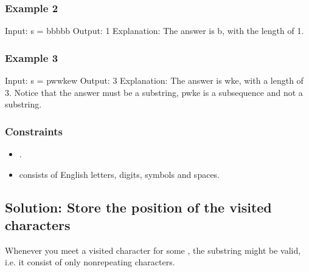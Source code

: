 \documentclass[letterpaper,12pt,english]{book}
\begin{document}
\subsubsection{Example 2}
\label{\detokenize{String/08_STR_3_Longest_Substring_Without_Repeating_Characters:example-2}}
\begin{sphinxVerbatim}[commandchars=\\\{\}]
Input: s = \PYGZdq{}bbbbb\PYGZdq{}
Output: 1
Explanation: The answer is \PYGZdq{}b\PYGZdq{}, with the length of 1.
\end{sphinxVerbatim}


\subsubsection{Example 3}
\label{\detokenize{String/08_STR_3_Longest_Substring_Without_Repeating_Characters:example-3}}
\begin{sphinxVerbatim}[commandchars=\\\{\}]
Input: s = \PYGZdq{}pwwkew\PYGZdq{}
Output: 3
Explanation: The answer is \PYGZdq{}wke\PYGZdq{}, with a length of 3.
Notice that the answer must be a substring, \PYGZdq{}pwke\PYGZdq{} is a subsequence and not a substring.
\end{sphinxVerbatim}


\subsubsection{Constraints}
\label{\detokenize{String/08_STR_3_Longest_Substring_Without_Repeating_Characters:constraints}}\begin{itemize}
\item {} 
\sphinxAtStartPar
{}.

\item {} 
\sphinxAtStartPar
{} consists of English letters, digits, symbols and spaces.

\end{itemize}


\subsection{Solution: Store the position of the visited characters}
\label{\detokenize{String/08_STR_3_Longest_Substring_Without_Repeating_Characters:solution-store-the-position-of-the-visited-characters}}
\sphinxAtStartPar
Whenever you meet a visited character  for some , the substring  might be valid, i.e. it consist of only nonrepeating characters.
\end{document}
